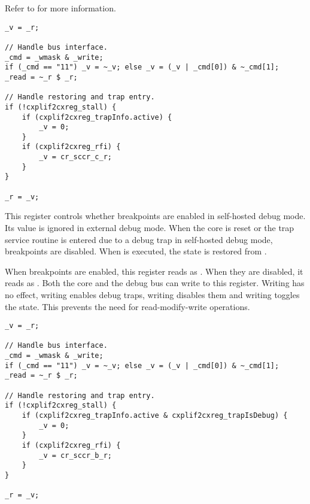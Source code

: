 Refer to  for more information.

\declaration{}
\implementation{}
\begin{lstlisting}
_v = _r;

// Handle bus interface.
_cmd = _wmask & _write;
if (_cmd == "11") _v = ~_v; else _v = (_v | _cmd[0]) & ~_cmd[1];
_read = ~_r $ _r;

// Handle restoring and trap entry.
if (!cxplif2cxreg_stall) {
    if (cxplif2cxreg_trapInfo.active) {
        _v = 0;
    }
    if (cxplif2cxreg_rfi) {
        _v = cr_sccr_c_r;
    }
}

_r = _v;
\end{lstlisting}

This register controls whether breakpoints are enabled in self-hosted debug 
mode. Its value is ignored in external debug mode. When the core is reset or the 
trap service routine is entered due to a debug trap in self-hosted debug mode, 
breakpoints are disabled. When  is executed, the state is restored 
from .

When breakpoints are enabled, this register reads as . When they are 
disabled, it reads as . Both the core and the debug bus can write to 
this register. Writing  has no effect, writing  enables debug 
traps, writing  disables them and writing  toggles the state. 
This prevents the need for read-modify-write operations.

\declaration{}
\implementation{}
\begin{lstlisting}
_v = _r;

// Handle bus interface.
_cmd = _wmask & _write;
if (_cmd == "11") _v = ~_v; else _v = (_v | _cmd[0]) & ~_cmd[1];
_read = ~_r $ _r;

// Handle restoring and trap entry.
if (!cxplif2cxreg_stall) {
    if (cxplif2cxreg_trapInfo.active & cxplif2cxreg_trapIsDebug) {
        _v = 0;
    }
    if (cxplif2cxreg_rfi) {
        _v = cr_sccr_b_r;
    }
}

_r = _v;
\end{lstlisting}

